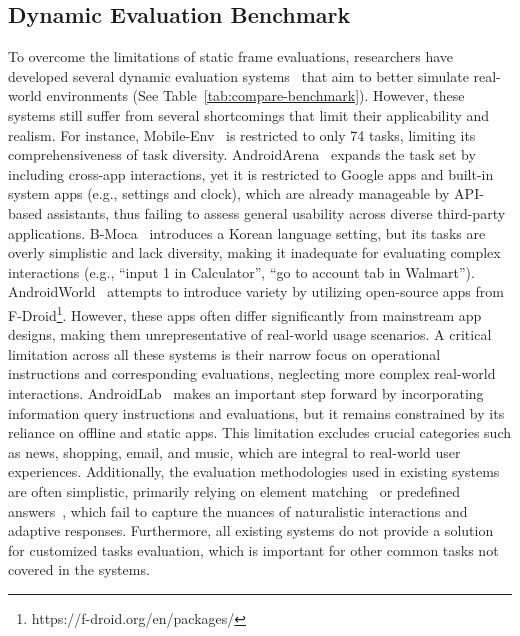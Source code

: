 \documentclass[11pt]{article}
\begin{document}
\subsection{Dynamic Evaluation Benchmark}

To overcome the limitations of static frame evaluations, researchers have developed several dynamic evaluation systems~\citep{lee2024bmoca, xu2024androidlab, xing2024androidarena, rawles2024androidworld, zhang2023mobileenv} that aim to better simulate real-world environments (See Table~\ref{tab:compare-benchmark}). However, these systems still suffer from several shortcomings that limit their applicability and realism. For instance, Mobile-Env~\citep{zhang2023mobileenv} is restricted to only 74 tasks, limiting its comprehensiveness of task diversity. AndroidArena~\citep{xing2024androidarena} expands the task set by including cross-app interactions, yet it is restricted to Google apps and built-in system apps (e.g., settings and clock), which are already manageable by API-based assistants, thus failing to assess general usability across diverse third-party applications. B-Moca~\citep{lee2024bmoca} introduces a Korean language setting, but its tasks are overly simplistic and lack diversity, making it inadequate for evaluating complex interactions (e.g., ``input 1 in Calculator'', ``go to account tab in Walmart''). AndroidWorld~\citep{rawles2024androidworld} attempts to introduce variety by utilizing open-source apps from F-Droid\footnote{https://f-droid.org/en/packages/}. However, these apps often differ significantly from mainstream app designs, making them unrepresentative of real-world usage scenarios. A critical limitation across all these systems is their narrow focus on operational instructions and corresponding evaluations, neglecting more complex real-world interactions. AndroidLab~\citep{xu2024androidlab} makes an important step forward by incorporating information query instructions and evaluations, but it remains constrained by its reliance on offline and static apps. This limitation excludes crucial categories such as news, shopping, email, and music, which are integral to real-world user experiences. Additionally, the evaluation methodologies used in existing systems are often simplistic, primarily relying on element matching~\citep{lee2024bmoca} or predefined answers~\citep{xu2024androidlab}, which fail to capture the nuances of naturalistic interactions and adaptive responses. Furthermore, all existing systems do not provide a solution for customized tasks evaluation, which is important for other common tasks not covered in the systems.
\end{document}
